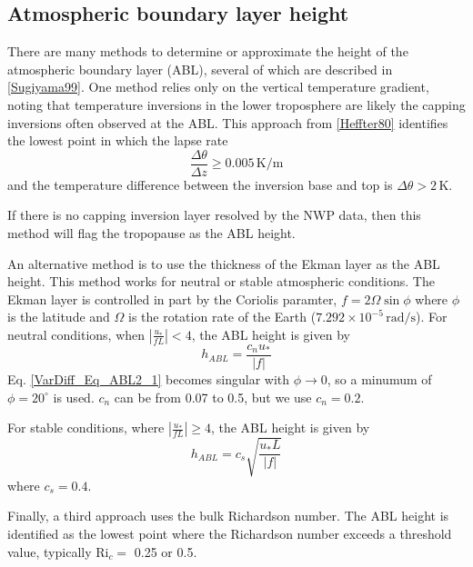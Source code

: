 \subsection{Atmospheric boundary layer height}

There are many methods to determine or approximate the height of the atmospheric boundary
layer (ABL), several of which are described in \ref{Sugiyama99}. One method relies only on the
vertical temperature gradient, noting that temperature inversions in the lower troposphere
are likely the capping inversions often observed at the ABL. This
approach from \ref{Heffter80} identifies the lowest point in which the lapse rate
\begin{equation}\label{VarDiff_Eq_ABL1}
\frac{\Delta \theta}{\Delta z} \ge 0.005 \, \mathrm{K} / \mathrm{m}
\end{equation}
and the temperature difference between the inversion base and top
is $\Delta \theta > 2 \, \mathrm{K}$.

If there is no capping inversion layer resolved by the NWP data, then this method
will flag the tropopause as the ABL height.

An alternative method is to use the thickness of the Ekman layer as the ABL height.
This method works for neutral or stable atmospheric conditions. The Ekman layer is
controlled in part by the Coriolis paramter, $f=2 \Omega \sin \phi$ where $\phi$
is the latitude and $\Omega$ is the rotation rate of the Earth
($7.292 \times 10^{-5} \, \mathrm{rad/s}$).  For neutral conditions,
when $\left| \frac{u_*}{f L}\right| < 4$, the ABL height is given by
\begin{equation}\label{VarDiff_Eq_ABL2_1}
h_{ABL} = \frac{c_n u_*}{|f|}
\end{equation}
Eq. \ref{VarDiff_Eq_ABL2_1} becomes singular with $\phi \rightarrow 0$, so a minumum
of $\phi=20^{\circ}$ is used. $c_n$ can be from 0.07 to 0.5, but we use $c_n=0.2$.

For stable conditions, where $\left| \frac{u_*}{f L}\right| \ge 4$, the ABL height is given by
\begin{equation}\label{VarDiff_Eq_ABL2_2}
h_{ABL} = c_s \sqrt{\frac{u_* L}{|f|}}
\end{equation}
where $c_s=0.4$.

Finally, a third approach uses the bulk Richardson number. The ABL height is identified as the
lowest point where the Richardson number exceeds a threshold value, typically $\mathrm{Ri}_c=$ 0.25 or
0.5.





